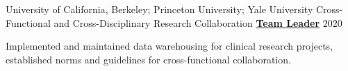 \begin{cventries}

  \cventry 
    {University of California, Berkeley; Princeton University; Yale University} %
    {Cross-Functional and Cross-Disciplinary Research Collaboration}
    {\href{http://www.actcompthink.org/pubs/McDougleTsayEtAl_2021.pdf}{\textbf{Team Leader}}} %
    {2020} %
    {
      \begin{cvitems} %
      	\item {Implemented and maintained data warehousing for clinical research projects, established norms and guidelines for cross-functional collaboration.}
      \end{cvitems}
    } 



\end{cventries}
